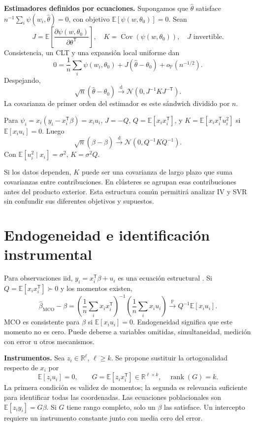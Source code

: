 \documentclass[11pt,a4paper]{article}
\newcommand{\R}{\mathbb R}
\newcommand{\E}{\mathbb E}
\newcommand{\Prob}{\mathbb P}
\newcommand{\T}{^{\mathsf T}}
\DeclareMathOperator{\Cov}{Cov}
\DeclareMathOperator{\rank}{rank}
\newcommand{\pto}{\xrightarrow{\Prob}}
\newcommand{\dto}{\xrightarrow{\mathrm d}}
\newcommand{\Normal}{\mathcal N}
\newcommand{\topic}[2]{\clearpage\section{#1}\label{#2}}
\theoremstyle{definition}\newtheorem{definicion}[teorema]{Definición}
\begin{document}
\textbf{Estimadores definidos por ecuaciones.}
Supongamos que $\widehat\theta$ satisface
$n^{-1}\sum_i\psi(w_i,\widehat\theta)=0$,
con objetivo $\E[\psi(w,\theta_0)]=0$.
Sean
\[
J=\E\!\left[\frac{\partial\psi(w,\theta_0)}{\partial\theta\T}\right],
\quad K=\Cov(\psi(w,\theta_0)),
\quad J\text{ invertible}.
\]
Consistencia, un CLT y una expansión local uniforme dan
\[
0=\frac1n\sum_i\psi(w_i,\theta_0)+J(\widehat\theta-\theta_0)
+o_{\Prob}(n^{-1/2}).
\]
Despejando,
\[
\boxed{\sqrt n(\widehat\theta-\theta_0)
\dto\Normal(0,J^{-1}KJ^{-\mathsf T})}.
\]
La covarianza de primer orden del estimador es este sándwich dividido por $n$.

\begin{ejemplo}
Para $\psi_i=x_i(y_i-x_i\T\beta)=x_iu_i$,
$J=-Q$, $Q=\E[x_ix_i\T]$, y $K=\E[x_ix_i\T u_i^2]$ si
$\E[x_iu_i]=0$. Luego
\[
\sqrt n(\widehat\beta-\beta)\dto
\Normal(0,Q^{-1}KQ^{-1}).
\]
Con $\E[u_i^2\mid x_i]=\sigma^2$, $K=\sigma^2Q$.
\end{ejemplo}
Si los datos dependen, $K$ puede ser una covarianza de largo plazo que suma
covarianzas entre contribuciones. En clústeres se agrupan esas contribuciones
antes del producto exterior.
Esta estructura común permitirá analizar IV y SVR sin confundir sus
diferentes objetivos y supuestos.
\topic{Endogeneidad e identificación instrumental}{s43}
Para observaciones iid, $y_i=x_i\T\beta+u_i$ es una ecuación estructural \cite{hansen}.
Si $Q=\E[x_ix_i\T]\succ0$ y los momentos existen,
\[
\widehat\beta_{\mathrm{MCO}}-\beta
=\left(\frac1n\sum_i x_ix_i\T\right)^{-1}
\left(\frac1n\sum_i x_iu_i\right)
\pto Q^{-1}\E[x_iu_i].
\]
MCO es consistente para $\beta$ si $\E[x_iu_i]=0$.
Endogeneidad significa que este momento no es cero. Puede deberse a
variables omitidas, simultaneidad, medición con error u otros mecanismos.

\textbf{Instrumentos.}
Sea $z_i\in\R^\ell$, $\ell\ge k$.
Se propone sustituir la ortogonalidad respecto de $x_i$ por
\[
\E[z_iu_i]=0,\qquad
G=\E[z_ix_i\T]\in\R^{\ell\times k},\quad \rank(G)=k.
\]
La primera condición es validez de momentos; la segunda es relevancia
suficiente para identificar todas las coordenadas.
Las ecuaciones poblacionales son
$\E[z_iy_i]=G\beta$.
Si $G$ tiene rango completo, solo un $\beta$ las satisface.
Un intercepto requiere un instrumento constante junto con media cero
del error.
\end{document}
